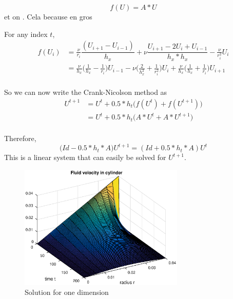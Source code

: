 

\newline
{}
$$f(U)=A*U$$ et on . Cela because en gros

For any index $t$,
\begin{align*}
f(U_i ) &= \frac{\nu}{r_i}\dfrac{(U_{i+1}-U_{i-1})}{h_x}+\nu\dfrac{U_{i+1}-2U_{i}+U_{i-1}}{h_{x}*h_{x}} -\frac{\nu}{r_{i}^2}U_{i}\\
&= \frac{\nu}{h_x}\Big( \frac{1}{h_x} - \frac{1}{r_i}\Big)U_{i-1} 
 -\nu\Big( \frac{2}{h_{x}^2} + \frac{1}{r_{i}^{2}}\Big)U_{i}
+ \frac{\nu}{h_x}\Big( \frac{1}{h_x} + \frac{1}{r_i}\Big)U_{i+1}\\
\end{align*} 

So we can now write the Crank-Nicolson method as
\begin{align*}
U^{t+1} &= U^{t} + 0.5*h_{t}\Big(f(U^{t}) + f(U^{t+1})\Big)\\
  &= U^{t} + 0.5*h_{t}\Big(A*U^{t} + A*U^{t+1}\Big)\\
\end{align*}

Therefore,
$$\Big(Id -0.5*h_{t}*A\big)U^{t+1} = (Id + 0.5*h_{t}*A)U^{t}$$
This is a linear system that can easily be solved for $U^{t+1}$.







\begin{figure}[!h]
\centering
\includegraphics[width = 0.7\textwidth]{./dim1.eps}
\caption{Solution for one dimension}
\label{fig:dim1sol}
\end{figure}
\FloatBarrier
